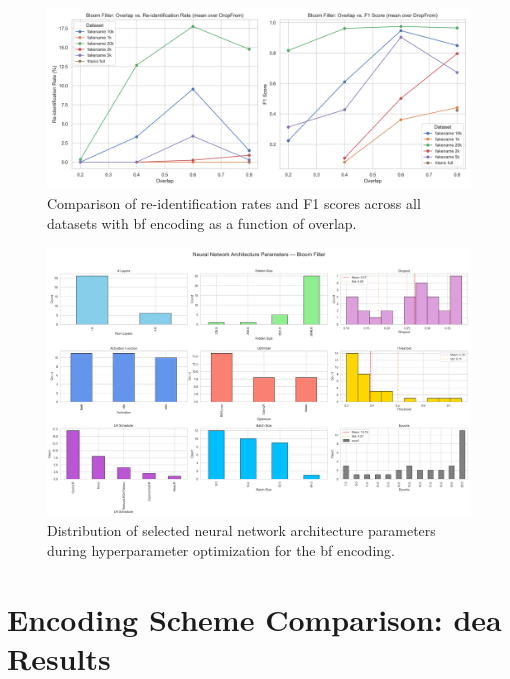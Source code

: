 \begin{figure}[H]
    \centering
    \includegraphics[width=\textwidth]{figures/BloomFilter_overlap_summary.png}
    \caption{Comparison of re-identification rates and F1 scores across all datasets with \ac{bf} encoding as a function of overlap.}
    \label{fig:bloomfilter_overlap}
\end{figure}

\begin{figure}[H]
    \centering
    \includegraphics[width=\textwidth]{figures/BloomFilter_architecture.png}
    \caption{Distribution of selected neural network architecture parameters during hyperparameter optimization for the \ac{bf} encoding.}
    \label{fig:bloomfilter_architecture}
\end{figure}

\clearpage

\section{Encoding Scheme Comparison: \ac{dea} Results} \label{sec:encoding_comparison_results}

